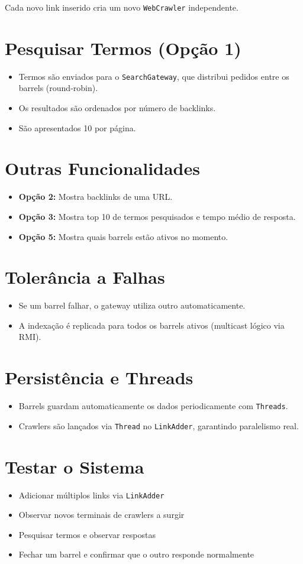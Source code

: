 \documentclass{article}
\begin{document}
Cada novo link inserido cria um novo \texttt{WebCrawler} independente.

\section{Pesquisar Termos (Opção 1)}
\begin{itemize}
  \item Termos são enviados para o \texttt{SearchGateway}, que distribui pedidos entre os barrels (round-robin).
  \item Os resultados são ordenados por número de backlinks.
  \item São apresentados 10 por página.
\end{itemize}

\section{Outras Funcionalidades}
\begin{itemize}
  \item \textbf{Opção 2:} Mostra backlinks de uma URL.
  \item \textbf{Opção 3:} Mostra top 10 de termos pesquisados e tempo médio de resposta.
  \item \textbf{Opção 5:} Mostra quais barrels estão ativos no momento.
\end{itemize}

\section{Tolerância a Falhas}
\begin{itemize}
  \item Se um barrel falhar, o gateway utiliza outro automaticamente.
  \item A indexação é replicada para todos os barrels ativos (multicast lógico via RMI).
\end{itemize}

\section{Persistência e Threads}
\begin{itemize}
  \item Barrels guardam automaticamente os dados periodicamente com \texttt{Threads}.
  \item Crawlers são lançados via \texttt{Thread} no \texttt{LinkAdder}, garantindo paralelismo real.
\end{itemize}

\section{Testar o Sistema}
\begin{itemize}
  \item Adicionar múltiplos links via \texttt{LinkAdder}
  \item Observar novos terminais de crawlers a surgir
  \item Pesquisar termos e observar respostas
  \item Fechar um barrel e confirmar que o outro responde normalmente
\end{itemize}
\end{document}
